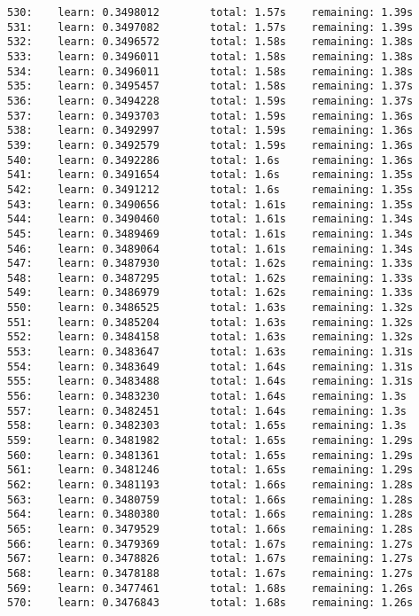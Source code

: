 \documentclass[11pt]{article}
\begin{document}
\begin{Verbatim}[commandchars=\\\{\}]
530:    learn: 0.3498012        total: 1.57s    remaining: 1.39s
531:    learn: 0.3497082        total: 1.57s    remaining: 1.39s
532:    learn: 0.3496572        total: 1.58s    remaining: 1.38s
533:    learn: 0.3496011        total: 1.58s    remaining: 1.38s
534:    learn: 0.3496011        total: 1.58s    remaining: 1.38s
535:    learn: 0.3495457        total: 1.58s    remaining: 1.37s
536:    learn: 0.3494228        total: 1.59s    remaining: 1.37s
537:    learn: 0.3493703        total: 1.59s    remaining: 1.36s
538:    learn: 0.3492997        total: 1.59s    remaining: 1.36s
539:    learn: 0.3492579        total: 1.59s    remaining: 1.36s
540:    learn: 0.3492286        total: 1.6s     remaining: 1.36s
541:    learn: 0.3491654        total: 1.6s     remaining: 1.35s
542:    learn: 0.3491212        total: 1.6s     remaining: 1.35s
543:    learn: 0.3490656        total: 1.61s    remaining: 1.35s
544:    learn: 0.3490460        total: 1.61s    remaining: 1.34s
545:    learn: 0.3489469        total: 1.61s    remaining: 1.34s
546:    learn: 0.3489064        total: 1.61s    remaining: 1.34s
547:    learn: 0.3487930        total: 1.62s    remaining: 1.33s
548:    learn: 0.3487295        total: 1.62s    remaining: 1.33s
549:    learn: 0.3486979        total: 1.62s    remaining: 1.33s
550:    learn: 0.3486525        total: 1.63s    remaining: 1.32s
551:    learn: 0.3485204        total: 1.63s    remaining: 1.32s
552:    learn: 0.3484158        total: 1.63s    remaining: 1.32s
553:    learn: 0.3483647        total: 1.63s    remaining: 1.31s
554:    learn: 0.3483649        total: 1.64s    remaining: 1.31s
555:    learn: 0.3483488        total: 1.64s    remaining: 1.31s
556:    learn: 0.3483230        total: 1.64s    remaining: 1.3s
557:    learn: 0.3482451        total: 1.64s    remaining: 1.3s
558:    learn: 0.3482303        total: 1.65s    remaining: 1.3s
559:    learn: 0.3481982        total: 1.65s    remaining: 1.29s
560:    learn: 0.3481361        total: 1.65s    remaining: 1.29s
561:    learn: 0.3481246        total: 1.65s    remaining: 1.29s
562:    learn: 0.3481193        total: 1.66s    remaining: 1.28s
563:    learn: 0.3480759        total: 1.66s    remaining: 1.28s
564:    learn: 0.3480380        total: 1.66s    remaining: 1.28s
565:    learn: 0.3479529        total: 1.66s    remaining: 1.28s
566:    learn: 0.3479369        total: 1.67s    remaining: 1.27s
567:    learn: 0.3478826        total: 1.67s    remaining: 1.27s
568:    learn: 0.3478188        total: 1.67s    remaining: 1.27s
569:    learn: 0.3477461        total: 1.68s    remaining: 1.26s
570:    learn: 0.3476843        total: 1.68s    remaining: 1.26s

\end{Verbatim}
\end{document}
